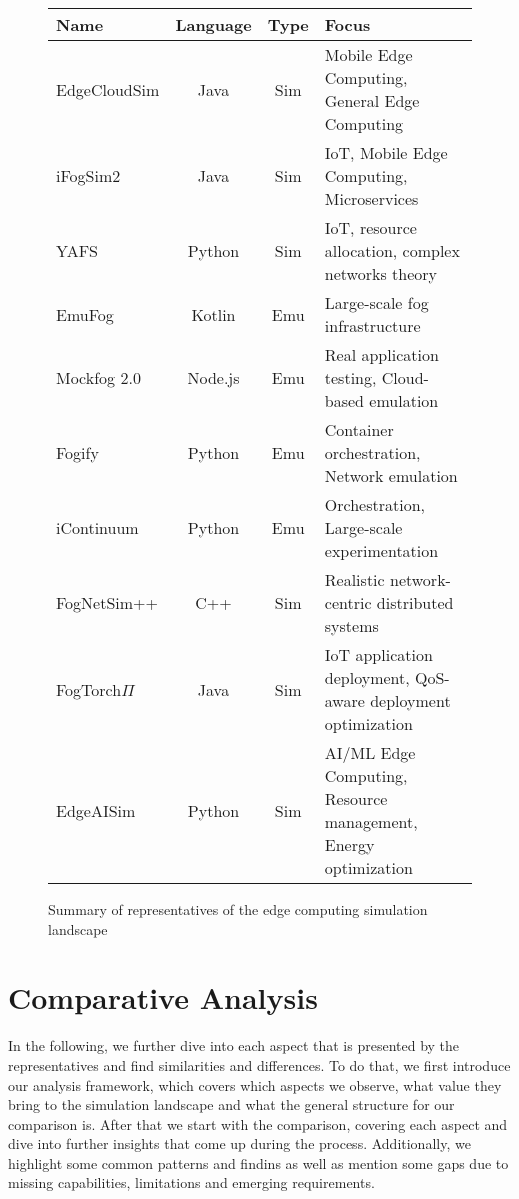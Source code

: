 \begin{figure}[H]
  \centering
  \begin{tabularx}{\textwidth}{l | c | c | X }
    \hline
    \textbf{Name} & \textbf{Language} & \textbf{Type} & \textbf{Focus} \\\hline
    EdgeCloudSim  & Java & Sim & Mobile Edge Computing, General Edge Computing\\\hline
    iFogSim2      & Java & Sim & IoT, Mobile Edge Computing, Microservices\\\hline
    YAFS          & Python & Sim & IoT, resource allocation, complex networks theory\\\hline
    EmuFog        & Kotlin & Emu & Large-scale fog infrastructure\\\hline
    Mockfog 2.0   & Node.js & Emu & Real application testing, Cloud-based emulation\\\hline
    Fogify        & Python & Emu & Container orchestration, Network emulation\\\hline
    iContinuum    & Python & Emu & Orchestration, Large-scale experimentation\\\hline
    FogNetSim++   & C++ & Sim & Realistic network-centric distributed systems\\\hline
    FogTorch$\Pi$ & Java & Sim & IoT application deployment, QoS-aware deployment optimization\\\hline
    EdgeAISim     & Python & Sim & AI/ML Edge Computing, Resource management, Energy optimization\\\hline
  \end{tabularx}
  \caption{Summary of representatives of the edge computing simulation landscape}
  \label{tab:overview-table-representatives}
\end{figure}

\section{Comparative Analysis}
In the following, we further dive into each aspect that is presented by the representatives and find similarities and differences.
To do that, we first introduce our analysis framework, which covers which aspects we observe, what value they bring to the simulation landscape and what the general structure for our comparison is.
After that we start with the comparison, covering each aspect and dive into further insights that come up during the process.
Additionally, we highlight some common patterns and findins as well as mention some gaps due to missing capabilities, limitations and emerging requirements.


